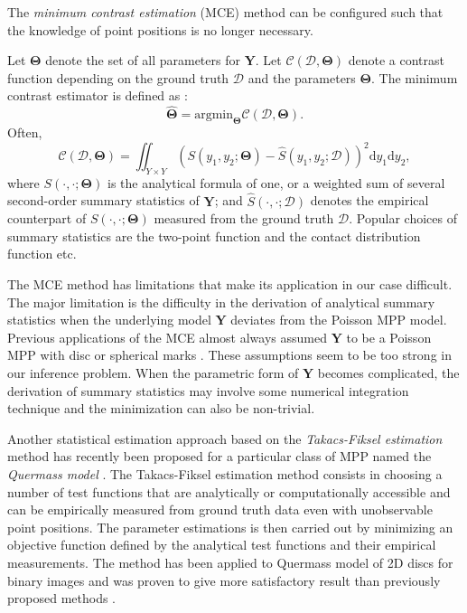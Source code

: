 \documentclass[journal]{IEEEtran}
\newcommand{\dd}[1]{\mathrm{d}#1}%
\begin{document}
The \textit{minimum contrast estimation} (MCE) method can be
configured such that the knowledge of point positions is no longer
necessary.

Let $\mathbf{\Theta}$ denote the set of all parameters for
$\mathbf{Y}$. Let $\mathcal{C}(\mathcal{D}, \mathbf{\Theta})$ denote a
contrast function depending on the ground truth $\mathcal{D}$ and the
parameters $\mathbf{\Theta}$. The minimum contrast estimator is
defined as \cite{chiu2013stochastic}:
\begin{equation}
  \label{eq:min-const}
  \hat{\mathbf{\Theta}} =
  \text{argmin}_{\mathbf{\Theta}}
  \mathcal{C}(\mathcal{D}, \mathbf{\Theta}).
\end{equation}
Often,
\begin{equation}
  \label{eq:min-often}
  \mathcal{C}(\mathcal{D}, \mathbf{\Theta}) = \iint_{Y \times Y}
  \left( S(y_1, y_2; \mathbf{\Theta}) - \hat{S}(y_1, y_2;
    \mathcal{D}) \right)^2 \dd y_1 \dd y_2,
\end{equation}
where $S(\cdot, \cdot; \mathbf{\Theta})$ is the analytical formula of
one, or a weighted sum of several second-order summary statistics of
$\mathbf{Y}$; and $\hat{S}(\cdot, \cdot; \mathcal{D})$ denotes the
empirical counterpart of $S(\cdot, \cdot; \mathbf{\Theta})$ measured
from the ground truth $\mathcal{D}$. Popular choices of summary
statistics are the two-point function \cite{diggle1981binary} and the
contact distribution function \cite {heinrich1993asymptotic} etc.

The MCE method has limitations that make its application in our case
difficult. The major limitation is the difficulty in the derivation of
analytical summary statistics when the underlying model $\mathbf{Y}$
deviates from the Poisson MPP model. Previous applications of the MCE
almost always assumed $\mathbf{Y}$ to be a Poisson MPP with disc or
spherical marks \cite{diggle1981binary} \cite
{heinrich1993asymptotic}. These assumptions seem to be too strong in
our inference problem. When the parametric form of $\mathbf{Y}$
becomes complicated, the derivation of summary statistics may involve
some numerical integration technique and the minimization can also be
non-trivial.

Another statistical estimation approach based on the
\textit{Takacs-Fiksel estimation} method \cite{dereudre2014estimation}
has recently been proposed for a particular class of MPP named the
\textit{Quermass model} \cite{kendall1997some}. The Takacs-Fiksel
estimation method consists in choosing a number of test functions that
are analytically or computationally accessible and can be empirically
measured from ground truth data even with unobservable point
positions. The parameter estimations is then carried out by minimizing
an objective function defined by the analytical test functions and
their empirical measurements. The method has been applied to Quermass
model of 2D discs for binary images \cite{dereudre2014estimation} and
was proven to give more satisfactory result than previously proposed
methods \cite{moller2010likelihood}.
\end{document}

